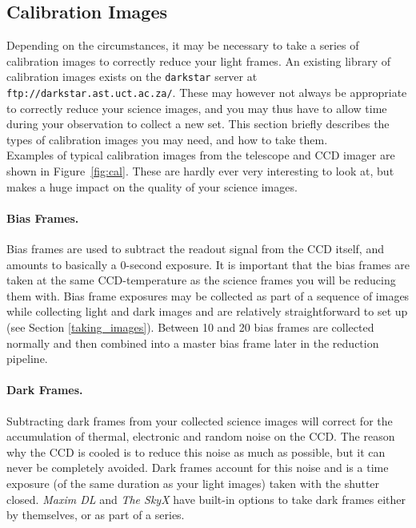 \documentclass[12pt,twoside,a4paper]{report}
\begin{document}
\clearpage

\subsection{Calibration Images}
\label{calibration}

Depending on the circumstances, it may be necessary to take a series of calibration images to correctly reduce your light frames. An existing library of calibration images exists on the {\tt darkstar} server at {\tt ftp://darkstar.ast.uct.ac.za/}. These may however not always be appropriate to correctly reduce your science images, and you may thus have to allow time during your observation to collect a new set. This section briefly describes the types of calibration images you may need, and how to take them.\\

Examples of typical calibration images from the telescope and CCD imager are shown in Figure~\ref{fig:cal}. These are hardly ever very interesting to look at, but makes a huge impact on the quality of your science images.\\

\paragraph{Bias Frames.}
  Bias frames are used to subtract the readout signal from the CCD itself, and amounts to basically a 0-second exposure. It is important that the bias frames are taken at the same CCD-temperature as the science frames you will be reducing them with. Bias frame exposures may be collected as part of a sequence of images while collecting light and dark images and are relatively straightforward to set up (see Section \ref{taking_images}). Between 10 and 20 bias frames are collected normally and then combined into a master bias frame later in the reduction pipeline.

\paragraph{Dark Frames.}
  Subtracting dark frames from your collected science images will correct for the accumulation of thermal, electronic and random noise on the CCD. The reason why the CCD is cooled is to reduce this noise as much as possible, but it can never be completely avoided. Dark frames account for this noise and is a time exposure (of the same duration as your light images) taken with the shutter closed. \emph{Maxim DL} and \emph{The SkyX} have built-in options to take dark frames either by themselves, or as part of a series.
\end{document}
